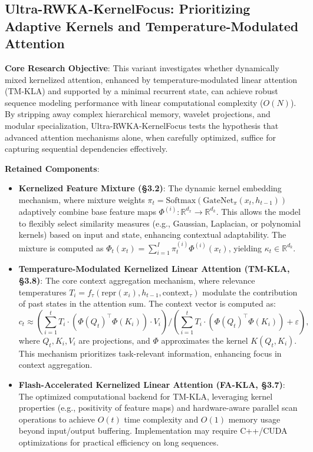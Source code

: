 \documentclass{article}
\begin{document}
\subsection{Ultra-RWKA-KernelFocus: Prioritizing Adaptive Kernels and Temperature-Modulated Attention}
\textbf{Core Research Objective}: This variant investigates whether dynamically mixed kernelized attention, enhanced by temperature-modulated linear attention (TM-KLA) and supported by a minimal recurrent state, can achieve robust sequence modeling performance with linear computational complexity ($O(N)$). By stripping away complex hierarchical memory, wavelet projections, and modular specialization, Ultra-RWKA-KernelFocus tests the hypothesis that advanced attention mechanisms alone, when carefully optimized, suffice for capturing sequential dependencies effectively.

\textbf{Retained Components}:
\begin{itemize}
    \item \textbf{Kernelized Feature Mixture (\S3.2)}: The dynamic kernel embedding mechanism, where mixture weights $\pi_t = \text{Softmax}(\text{GateNet}_\pi(x_t, h_{t-1}))$ adaptively combine base feature maps $\Phi^{(i)}: \mathbb{R}^{d_x} \to \mathbb{R}^{d_k}$. This allows the model to flexibly select similarity measures (e.g., Gaussian, Laplacian, or polynomial kernels) based on input and state, enhancing contextual adaptability. The mixture is computed as $\Phi_t(x_t) = \sum_{i=1}^I \pi_t^{(i)} \Phi^{(i)}(x_t)$, yielding $\kappa_t \in \mathbb{R}^{d_k}$.
    \item \textbf{Temperature-Modulated Kernelized Linear Attention (TM-KLA, \S3.8)}: The core context aggregation mechanism, where relevance temperatures $T_i = f_\tau(\text{repr}(x_i), h_{t-1}, \text{context}_\tau)$ modulate the contribution of past states in the attention sum. The context vector is computed as:
    \[
    c_t \approx \left( \sum_{i=1}^t T_i \cdot (\Phi(Q_t)^\top \Phi(K_i)) \cdot V_i \right) / \left( \sum_{i=1}^t T_i \cdot (\Phi(Q_t)^\top \Phi(K_i)) + \varepsilon \right),
    \]
    where $Q_t, K_i, V_i$ are projections, and $\Phi$ approximates the kernel $K(Q_t, K_i)$. This mechanism prioritizes task-relevant information, enhancing focus in context aggregation.
    \item \textbf{Flash-Accelerated Kernelized Linear Attention (FA-KLA, \S3.7)}: The optimized computational backend for TM-KLA, leveraging kernel properties (e.g., positivity of feature maps) and hardware-aware parallel scan operations to achieve $O(t)$ time complexity and $O(1)$ memory usage beyond input/output buffering. Implementation may require C++/CUDA optimizations for practical efficiency on long sequences.
\end{itemize}
\end{document}
